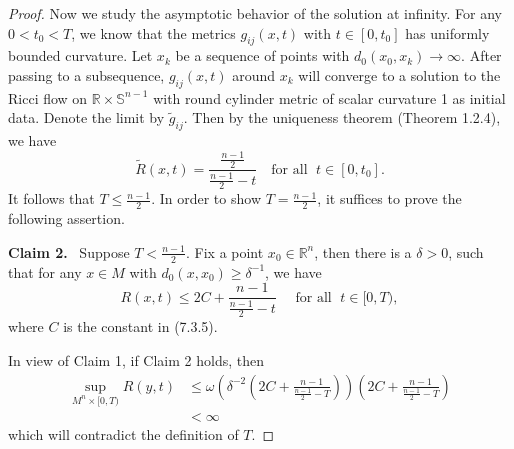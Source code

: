 \begin{proof}
Now we study the asymptotic behavior of the solution at infinity.
For any $0<t_{0}<T$, we know that the metrics $g_{ij}(x,t)$ with
$t\in [0,t_{0}]$ has uniformly bounded curvature.  Let $x_{k}$ be
a sequence of points with $d_{0}(x_{0},x_{k})\rightarrow \infty$.
After passing to a subsequence, $g_{ij}(x,t)$ around $x_{k}$ will
converge to a solution to the Ricci flow on $\mathbb{R}\times
\mathbb{S}^{n-1}$ with round cylinder metric of scalar curvature 1
as initial data.  Denote the limit by $\tilde{g}_{ij}$. Then by
the uniqueness theorem (Theorem 1.2.4), we have
$$
\tilde{R}(x,t) =\frac{\frac{n-1}{2}}{\frac{n-1}{2}-t}\quad
\text{for all }\; t\in[0,t_{0}].
$$
It follows that $T\leq \frac{n-1}{2}$. In order to show
$T=\frac{n-1}{2}$, it suffices to prove the following assertion.

\medskip
{\bf Claim 2.} \ Suppose $T<\frac{n-1}{2}$. Fix a point $x_{0}\in
\mathbb{R}^{n} $, then there is a $\delta>0$, such that for any
$x\in M$ with $d_{0}(x,x_{0})\geq \delta^{-1}$, we have
$$
R(x,t)\leq 2C+\frac{n-1}{\frac{n-1}{2}-t}\quad \text{ for all }\;
t\in[0,T),
$$
where $C$ is the constant in (7.3.5).

\medskip
In view of Claim 1, if Claim 2 holds, then
\begin{align*}
\sup_{M^{n}\times[0,T)}R(y,t) &  \leq
\omega\left(\delta^{-2}\left(2C+\frac{n-1}{\frac{n-1}{2}-T}\right)\right)
\left(2C+\frac{n-1}{\frac{n-1}{2}-T}\right)\\
&  < \infty
\end{align*}
which will contradict the definition of $T$.


\end{proof}
